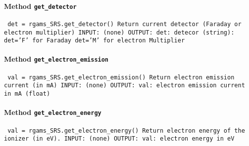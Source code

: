 \paragraph{Method \texttt{get_detector}}
\vspace{1ex}
\texttt{\newline
det = rgams_SRS.get_detector()\newline
\newline
Return current detector (Faraday or electron multiplier)\newline
\newline
INPUT:\newline
(none)\newline
\newline
OUTPUT:\newline
det: detecor (string):\newline
det='F' for Faraday\newline
det='M' for electron Multiplier\newline
\newline
}

\paragraph{Method \texttt{get_electron_emission}}
\vspace{1ex}
\texttt{\newline
val = rgams_SRS.get_electron_emission()\newline
\newline
Return electron emission current (in mA)\newline
\newline
INPUT:\newline
(none)\newline
\newline
OUTPUT:\newline
val: electron emission current in mA (float)\newline
\newline
}

\paragraph{Method \texttt{get_electron_energy}}
\vspace{1ex}
\texttt{\newline
val = rgams_SRS.get_electron_energy()\newline
\newline
Return electron energy of the ionizer (in eV).\newline
\newline
INPUT:\newline
(none)\newline
\newline
OUTPUT:\newline
val: electron energy in eV\newline
\newline
}

